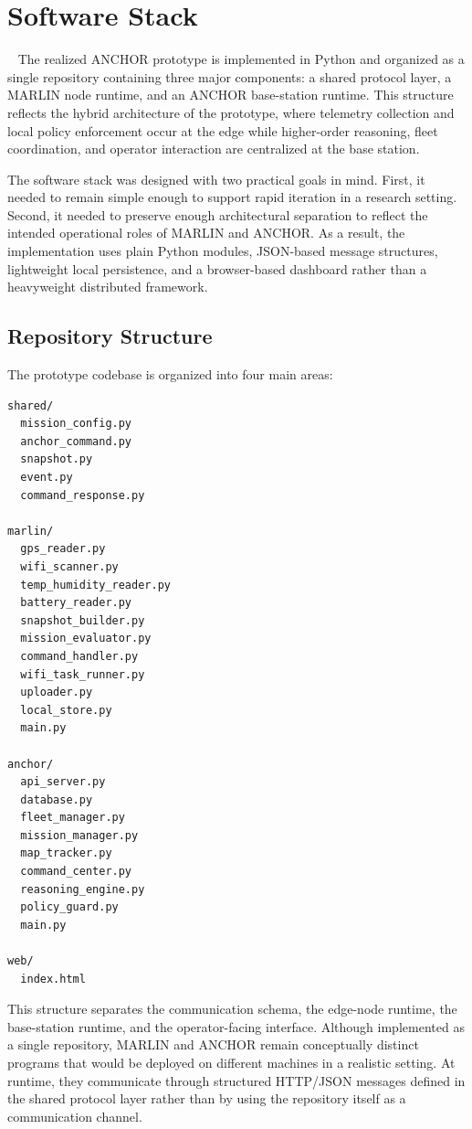\documentclass[journal]{IEEEtran}
\begin{document}
\section{Software Stack}~\label{stack}
The realized ANCHOR prototype is implemented in Python and organized as a single repository containing three major components: a shared protocol layer, a MARLIN node runtime, and an ANCHOR base-station runtime. This structure reflects the hybrid architecture of the prototype, where telemetry collection and local policy enforcement occur at the edge while higher-order reasoning, fleet coordination, and operator interaction are centralized at the base station.

The software stack was designed with two practical goals in mind. First, it needed to remain simple enough to support rapid iteration in a research setting. Second, it needed to preserve enough architectural separation to reflect the intended operational roles of MARLIN and ANCHOR. As a result, the implementation uses plain Python modules, JSON-based message structures, lightweight local persistence, and a browser-based dashboard rather than a heavyweight distributed framework.

\subsection{Repository Structure}
The prototype codebase is organized into four main areas:

\begin{verbatim}
shared/
  mission_config.py
  anchor_command.py
  snapshot.py
  event.py
  command_response.py

marlin/
  gps_reader.py
  wifi_scanner.py
  temp_humidity_reader.py
  battery_reader.py
  snapshot_builder.py
  mission_evaluator.py
  command_handler.py
  wifi_task_runner.py
  uploader.py
  local_store.py
  main.py

anchor/
  api_server.py
  database.py
  fleet_manager.py
  mission_manager.py
  map_tracker.py
  command_center.py
  reasoning_engine.py
  policy_guard.py
  main.py

web/
  index.html
\end{verbatim}

This structure separates the communication schema, the edge-node runtime, the base-station runtime, and the operator-facing interface. Although implemented as a single repository, MARLIN and ANCHOR remain conceptually distinct programs that would be deployed on different machines in a realistic setting. At runtime, they communicate through structured HTTP/JSON messages defined in the shared protocol layer rather than by using the repository itself as a communication channel.
\end{document}

